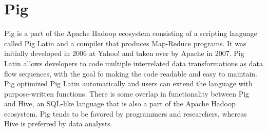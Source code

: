 \section{Pig}
Pig is a part of the Apache Hadoop ecosystem consisting of a scripting
language called Pig Latin and a compiler that produces Map-Reduce
programs. It was initially developed in 2006 at Yahoo! and taken over
by Apache in 2007\cite{hid-sp18-419-die2015datascience}. Pig Latin
allows developers to code multiple interrelated data transformations
as data flow sequences, with the goal fo making the code readable and
easy to maintain. Pig optimized Pig Latin automatically and users can
extend the language with purpose-written
functions\cite{hid-sp18-419-www-pig}. There is some overlap in
functionality between Pig and Hive, an SQL-like language that is also
a part of the Apache Hadoop ecosystem. Pig tends to be favored by
programmers and researchers, whereas Hive is preferred by data
analysts\cite{hid-sp18-419-www-dezyre-pig}.
